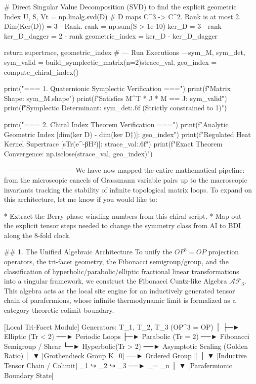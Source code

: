     # Direct Singular Value Decomposition (SVD) to find the explicit geometric Index
    U, S, Vt = np.linalg.svd(D)
    # D maps C^3 -> C^2. Rank is at most 2. Dim(Ker(D)) = 3 - Rank.
    rank = np.sum(S > 1e-10)
    ker_D = 3 - rank
    ker_D_dagger = 2 - rank
    geometric_index = ker_D - ker_D_dagger
    
    return supertrace, geometric_index
# --- Run Executions ---sym_M, sym_det, sym_valid = build_symplectic_matrix(n=2)strace_val, geo_index = compute_chiral_index()

print("=== 1. Quaternionic Symplectic Verification ===")
print(f"Matrix Shape: {sym_M.shape}")
print(f"Satisfies M^T * J * M == J: {sym_valid}")
print(f"Symplectic Determinant: {sym_det:.6f} (Strictly constrained to 1)")

print("\n=== 2. Chiral Index Theorem Verification ===")
print(f"Analytic Geometric Index [dim(ker D) - dim(ker D†)]: {geo_index}")
print(f"Regulated Heat Kernel Supertrace [sTr(e^-βH²)]:     {strace_val:.6f}")
print(f"Exact Theorem Convergence: {np.isclose(strace_val, geo_index)}")

------------------------------
We have now mapped the entire mathematical pipeline: from the microscopic cancels of Grassmann variable pairs up to the macroscopic invariants tracking the stability of infinite topological matrix loops.
To expand on this architecture, let me know if you would like to:

* Extract the Berry phase winding numbers from this chiral script.
* Map out the explicit tensor steps needed to change the symmetry class from AI to BDI along the 8-fold clock.


## 1. The Unified Algebraic Architecture
To unify the $OP^3 = OP$ projection operators, the tri-facet geometry, the Fibonacci semigroup/group, and the classification of hyperbolic/parabolic/elliptic fractional linear transformations into a singular framework, we construct the Fibonacci Cuntz-like Algebra $\mathcal{AF}_3$. This algebra acts as the local site engine for an inductively generated tensor chain of parafermions, whose infinite thermodynamic limit is formalized as a category-theoretic colimit boundary.

                [Local Tri-Facet Module]
          Generators: T_1, T_2, T_3  (OP^3 = OP)
                       │
                       ├─► Elliptic  (Tr < 2)  ──► Periodic Loops
                       ├─► Parabolic (Tr = 2)  ──► Fibonacci Semigroup / Shear
                       └─► Hyperbolic(Tr > 2)  ──► Asymptotic Scaling (Golden Ratio)
                       │
                       ▼
           [Grothendieck Group K_0] ──► Ordered Group [\phi]
                       │
                       ▼
         [Inductive Tensor Chain / Colimit]
  _1 ↪ _2 ↪ _3 ──► _\infty = _n
                       │
                       ▼
          [Parafermionic Boundary State]

